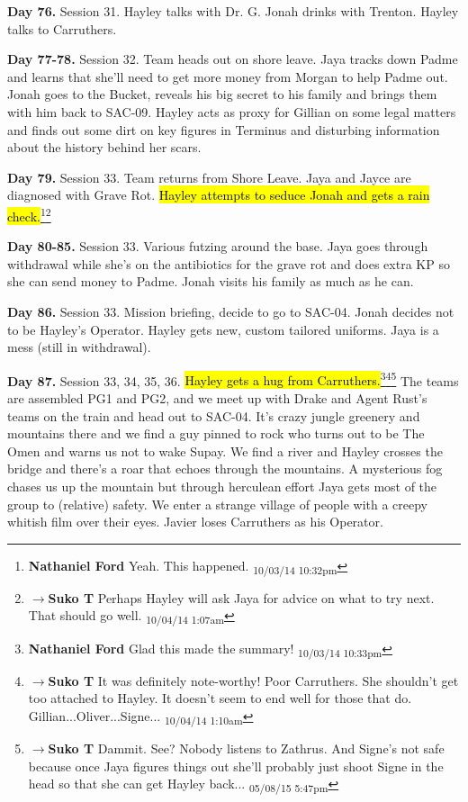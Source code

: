 \textbf{Day 76.}  Session 31.  Hayley talks with Dr. G.  Jonah drinks with Trenton.  Hayley talks to Carruthers. 

\textbf{Day 77-78.}  Session 32.  Team heads out on shore leave.  Jaya tracks down Padme and learns that she'll need to get more money from Morgan to help Padme out.  Jonah goes to the Bucket, reveals his big secret to his family and brings them with him back to SAC-09.   Hayley acts as proxy for Gillian on some legal matters and finds out some dirt on key figures in Terminus and disturbing information about the history behind her scars.

\textbf{Day 79.} Session 33.  Team returns from Shore Leave.  Jaya and Jayce are diagnosed with Grave Rot.  \hl{Hayley attempts to seduce Jonah and gets a rain check.}\footnote{\textbf{Nathaniel Ford }Yeah. This happened. \textsubscript{10/03/14 10:32pm}}\footnote{$\rightarrow$\textbf{Suko T }Perhaps Hayley will ask Jaya for advice on what to try next.  That should go well. \textsubscript{10/04/14 1:07am}}

\textbf{Day 80-85.}  Session 33.  Various futzing around the base.  Jaya goes through withdrawal while she's on the antibiotics for the grave rot and does extra KP so she can send money to Padme.  Jonah visits his family as much as he can.

\textbf{Day 86.} Session 33.  Mission briefing, decide to go to SAC-04.  Jonah decides not to be Hayley's Operator.  Hayley gets new, custom tailored uniforms.  Jaya is a mess (still in withdrawal).  

\textbf{Day 87.} Session 33, 34, 35, 36.  \hl{Hayley gets a hug from Carruthers.}\footnote{\textbf{Nathaniel Ford }Glad this made the summary! \textsubscript{10/03/14 10:33pm}}\footnote{$\rightarrow$\textbf{Suko T }It was definitely note-worthy!  Poor Carruthers.  She shouldn't get too attached to Hayley.  It doesn't seem to end well for those that do.  Gillian...Oliver...Signe... \textsubscript{10/04/14 1:10am}}\footnote{$\rightarrow$\textbf{Suko T }Dammit. See?  Nobody listens to Zathrus.  And Signe's not safe because once Jaya figures things out she'll probably just shoot Signe in the head so that she can get Hayley back... \textsubscript{05/08/15 5:47pm}}  The teams are assembled PG1 and PG2, and we meet up with Drake and Agent Rust's teams on the train and head out to SAC-04.  It's crazy jungle greenery and mountains there and we find a guy pinned to rock who turns out to be The Omen and warns us not to wake Supay.  We find a river and Hayley crosses the bridge and there's a roar that echoes through the mountains.  A mysterious fog chases us up the mountain but through herculean effort Jaya gets most of the group to (relative) safety.  We enter a strange village of people with a creepy whitish film over their eyes.  Javier loses Carruthers as his Operator.

